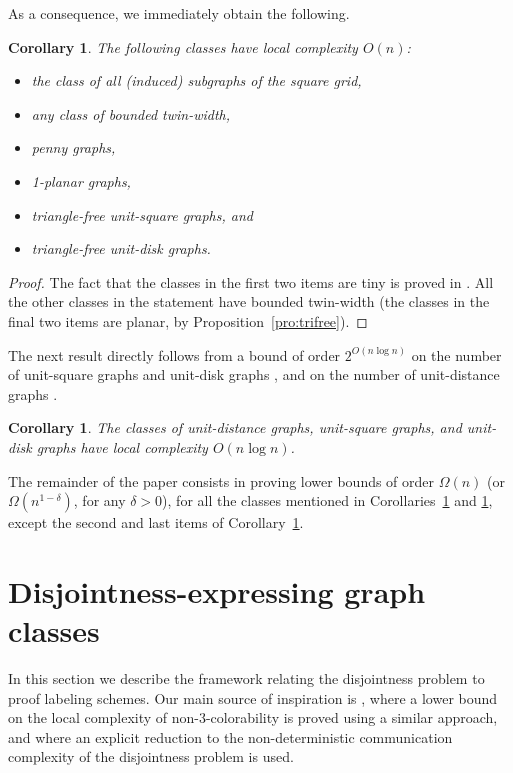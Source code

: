 \documentclass[a4paper,reqno, 12pt]{amsart}
\newtheorem{corollary}[theorem]{Corollary}
\begin{document}
As a consequence, we immediately obtain the following.

\begin{corollary}\label{cor:linear}
  The following classes have local complexity $O(n)$:
  \begin{itemize}
    \item the class of all (induced) subgraphs of the square grid,
      \item any class of bounded twin-width,
    \item penny graphs,
    \item 1-planar graphs,
    \item triangle-free unit-square graphs, and
      \item triangle-free unit-disk graphs.
  \end{itemize}
\end{corollary}

\begin{proof}
The fact that the classes in the first two items are  tiny is proved
in \cite{bonnet2021twin}. All the other classes in the statement have bounded twin-width
(the classes in the final two items are planar, by Proposition~\ref{pro:trifree}).
\end{proof}

The next result directly follows from a bound of order $2^{O(n\log n)}$ on the
number of unit-square graphs and unit-disk graphs
\cite{MCDIARMID2014413}, and on the number of unit-distance graphs \cite{alon2014two}.

\begin{corollary}\label{cor:nlogn}
  The classes of unit-distance graphs, unit-square graphs, and unit-disk graphs have local complexity $O(n\log n)$.
\end{corollary}

The remainder of the paper consists in proving lower bounds of order
$\Omega(n)$ (or $\Omega(n^{1-\delta})$, for any $\delta>0$), for all
the classes mentioned in Corollaries~\ref{cor:linear} and
\ref{cor:nlogn}, except the second and last items of Corollary~\ref{cor:linear}.

\section{Disjointness-expressing graph classes}
\label{sec:disjcla}

In this section we describe the framework relating the
disjointness problem to
proof labeling schemes. 
Our main source of inspiration is \cite{lcp},  where a lower bound
on the local complexity of non-3-colorability is proved using a
similar approach, and \cite{CPP20} where an explicit reduction to the
non-deterministic communication complexity of the disjointness
problem is used. 
\end{document}
